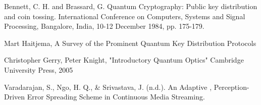 \begin{thebibliography}{2}
	Bennett, C. H. and Brassard,
	G. Quantum Cryptography: Public key distribution and coin tossing.
	International Conference on Computers, Systems and Signal Processing, Bangalore, India, 10-12 December 1984, pp. 175-179.
	
	Mart Haitjema, A Survey of the Prominent Quantum Key Distribution Protocols
	
	Christopher Gerry, Peter Knight, "Introductory Quantum Optics" Cambridge University Press, 2005
	
	Varadarajan, S., Ngo, H. Q., \& Srivastava, J. (n.d.). An Adaptive , Perception-Driven Error Spreading Scheme in Continuous Media Streaming.
	
\end{thebibliography}
\cleardoublepage

